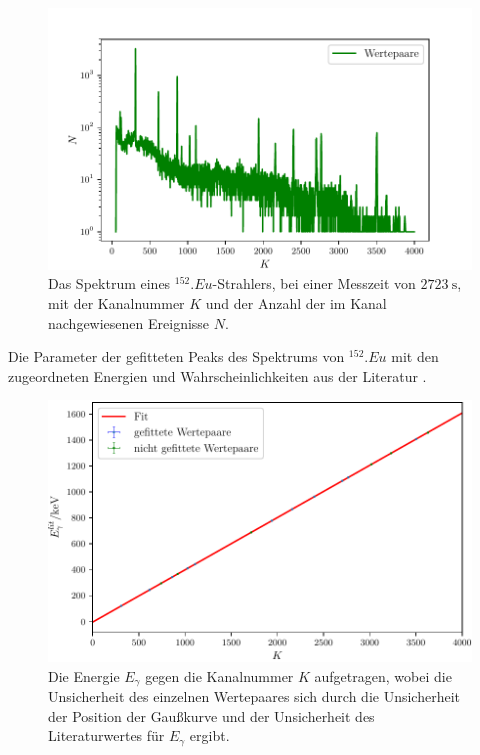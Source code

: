 \begin{figure}
	\centering
	\includegraphics[width=\linewidth-60pt,height=\textheight-60pt,keepaspectratio]{content/images/EU152_1-4000.pdf}
	\caption{Das Spektrum eines $^{152}.{Eu}$-Strahlers, bei einer Messzeit von $\SI{2723}{\second}$, mit der Kanalnummer $K$ und der Anzahl der im Kanal nachgewiesenen Ereignisse $N$.}
	\label{fig:SpektrumEu}
\end{figure}

\begin{table}
	\centering
	\caption{Die Parameter der gefitteten Peaks des Spektrums von $^{152}.{Eu}$ mit den zugeordneten Energien und Wahrscheinlichkeiten aus der Literatur \cite{MARTIN20131497}.}
	
	\label{tab:parameterEu}
\end{table}

\begin{figure}
	\centering
	\includegraphics[width=\linewidth-60pt,height=\textheight-60pt,keepaspectratio]{content/images/EnergieKali.pdf}
	\caption{Die Energie $E_\gamma$ gegen die Kanalnummer $K$ aufgetragen, wobei die Unsicherheit des einzelnen Wertepaares sich durch die Unsicherheit der Position der Gaußkurve und der Unsicherheit des Literaturwertes für $E_\gamma$ ergibt.}
	\label{fig:Kalibrierung}
\end{figure}


